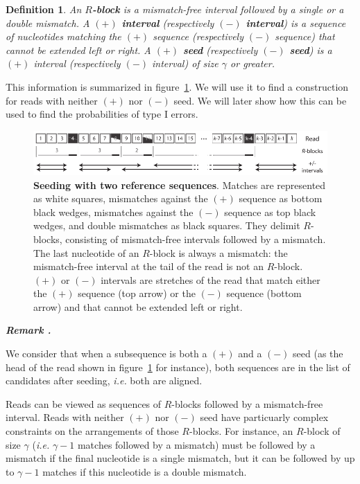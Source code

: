 \documentclass{article}
\newtheorem{definition}{Definition}
\newcounter{remarkcounter}
\newenvironment{remark}
{\small\it\vspace{0.5\baselineskip}
  \refstepcounter{remarkcounter}%
  \noindent\textbf{Remark \arabic{remarkcounter}.}%
}{\vspace{0.5\baselineskip}}
\begin{document}
\begin{definition}
An \textbf{$R$-block} is a mismatch-free interval followed by a single or
a double mismatch. A \textbf{$(+)$ interval} (respectively \textbf{$(-)$
interval}) is a sequence of nucleotides matching the $(+)$ sequence
(respectively $(-)$ sequence) that cannot be extended left or right. A
\textbf{$(+)$ seed} (respectively \textbf{$(-)$ seed}) is a $(+)$ interval
(respectively $(-)$ interval) of size $\gamma$ or greater.
\end{definition}

This information is summarized in figure~\ref{fig:sketchdual}. We will use
it to find a construction for reads with neither $(+)$ nor $(-)$ seed. We
will later show how this can be used to find the probabilities of type I
errors.

\begin{figure}[h]
\centering
\includegraphics[scale=0.88]{sketch_dual_mutations.pdf}
\caption{\textbf{Seeding with two reference sequences}.
Matches are represented as white squares, mismatches against the $(+)$
sequence as bottom black wedges, mismatches against the $(-)$ sequence as
top black wedges, and double mismatches as black squares. They delimit
$R$-blocks, consisting of mismatch-free intervals followed by a mismatch.
The last nucleotide of an $R$-block is always a mismatch: the
mismatch-free interval at the tail of the read is not an $R$-block. $(+)$
or $(-)$ intervals are stretches of the read that match either the $(+)$
sequence (top arrow) or the $(-)$ sequence (bottom arrow) and that cannot
be extended left or right.}
\label{fig:sketchdual}
\end{figure}

\begin{remark}
We consider that when a subsequence is both a $(+)$ and a $(-)$ seed (as
the head of the read shown in figure~\ref{fig:sketchdual} for instance),
both sequences are in the list of candidates after seeding, \textit{i.e.}
both are aligned.
\end{remark}

Reads can be viewed as sequences of $R$-blocks followed by a mismatch-free
interval. Reads with neither $(+)$ nor $(-)$ seed have particuarly complex
constraints on the arrangements of those $R$-blocks. For instance, an
$R$-block of size $\gamma$ (\textit{i.e.} $\gamma-1$ matches followed by a
mismatch) must be followed by a mismatch if the final nucleotide is a
single mismatch, but it can be followed by up to $\gamma-1$ matches if
this nucleotide is a double mismatch.
\end{document}
